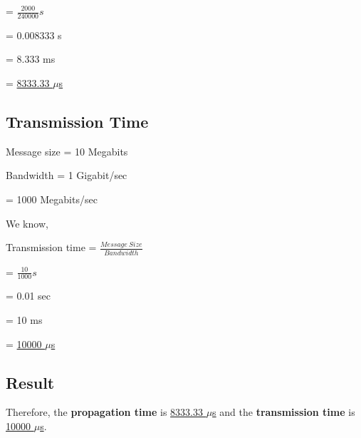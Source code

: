 \documentclass{article}
\begin{document}
\normalsize{
\hspace{3.35cm} = \Large{$\frac{2000}{240000} s$}
}
\vspace{2mm}

\normalsize{
\hspace{3.35cm} = 0.008333 s

\hspace{3.35cm} = 8.333 ms

\hspace{3.35cm} = \underline{8333.33 $\mu$s}
}

\newpage

\subsection{Transmission Time}

\vspace{2mm}
\hspace{5.5mm} Message size \hspace{1.3cm} = 10 Megabits

\hspace{0.3mm} Bandwidth \hspace{1.5cm} = 1 Gigabit/sec

\hspace{3.45cm} = 1000 Megabits/sec

\vspace{2mm}
\hspace{0.3mm} We know,

\hspace{0.3mm} Transmission time \hspace{0.35cm} = \Large{$ \frac{Message\ Size}{Bandwidth} $}
\vspace{2mm}

\normalsize{
\hspace{3.45cm} = \Large{$ \frac{10}{1000} s$}
}
\vspace{2mm}

\normalsize{
\hspace{3.45cm} = 0.01 sec

\hspace{3.45cm} = 10 ms

\hspace{3.45cm} = \underline{10000 $\mu$s}
}

\vspace{5mm}
\subsection{Result}

\vspace{2mm}
Therefore, the \textbf{propagation time} is \underline{8333.33 $\mu$s} and the \textbf{transmission time}
is \underline{10000 $\mu$s}.
\end{document}
